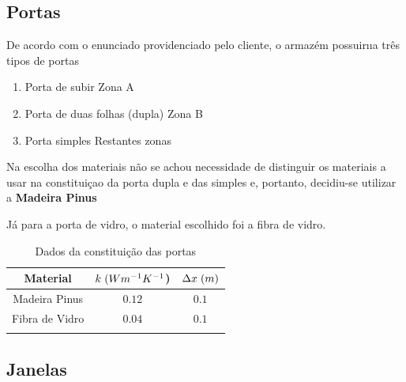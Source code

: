 \documentclass[12pt, a4paper]{article}
\begin{document}


\subsection{Portas}\label{sub:Portas}

De acordo com o enunciado providenciado pelo cliente, o armaz\'em possuir\i{\i}a
tr\^es tipos de portas

\begin{enumerate}
    \item Porta de subir {\textemdash} Zona A
    \item Porta de duas folhas (dupla) {\textemdash} Zona B
    \item Porta simples {\textemdash} Restantes zonas
\end{enumerate}

Na escolha dos materiais n\~ao se achou necessidade de distinguir os materiais a
usar na constitui\c{c}ao da porta dupla e das simples e, portanto, decidiu-se
utilizar a \textbf{Madeira Pinus} %

J\'a para a porta de vidro, o material escolhido foi a fibra de vidro.

\begin{table}[htpb]
    \begin{center}
        \begin{tabular}{c c c}
            \toprule{}
            Material & $ k \hspace{1mm} (Wm^{-1}K^{-1}$) & $ \Delta x \hspace{1mm} (m)$ \\
            \midrule{}
            Madeira Pinus & $0.12$ & $0.1$ \\
            \midrule{}
            Fibra de Vidro & $0.04$ & $0.1$ \\
            \bottomrule{}
        \end{tabular}
    \end{center}
    \caption{Dados da constitui\c{c}\~ao das portas}\label{tab:portas}
\end{table}



\subsection{Janelas}\label{sub:Janelas}
\end{document}
